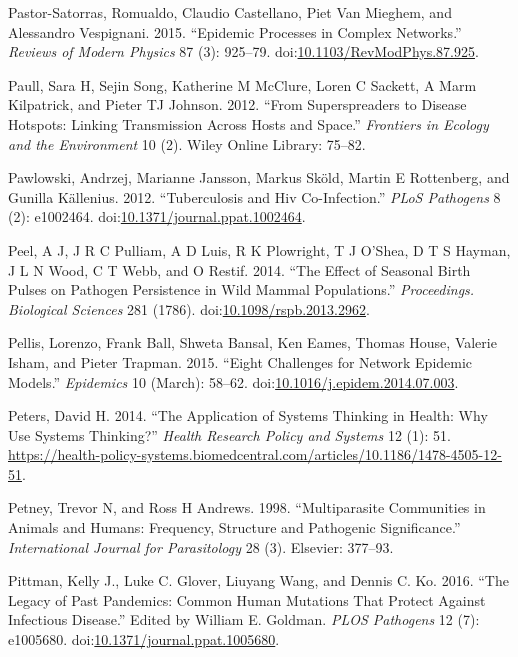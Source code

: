 \documentclass[]{article}
\theoremstyle{definition}
\theoremstyle{definition}
\theoremstyle{definition}
\theoremstyle{remark}
\begin{document}
\hypertarget{ref-pastor-satorras15}{}
Pastor-Satorras, Romualdo, Claudio Castellano, Piet Van Mieghem, and
Alessandro Vespignani. 2015. ``Epidemic Processes in Complex Networks.''
\emph{Reviews of Modern Physics} 87 (3): 925--79.
doi:\href{https://doi.org/10.1103/RevModPhys.87.925}{10.1103/RevModPhys.87.925}.

\hypertarget{ref-paull12}{}
Paull, Sara H, Sejin Song, Katherine M McClure, Loren C Sackett, A Marm
Kilpatrick, and Pieter TJ Johnson. 2012. ``From Superspreaders to
Disease Hotspots: Linking Transmission Across Hosts and Space.''
\emph{Frontiers in Ecology and the Environment} 10 (2). Wiley Online
Library: 75--82.

\hypertarget{ref-pawlowski12}{}
Pawlowski, Andrzej, Marianne Jansson, Markus Sköld, Martin E Rottenberg,
and Gunilla Källenius. 2012. ``Tuberculosis and Hiv Co-Infection.''
\emph{PLoS Pathogens} 8 (2): e1002464.
doi:\href{https://doi.org/10.1371/journal.ppat.1002464}{10.1371/journal.ppat.1002464}.

\hypertarget{ref-peel14}{}
Peel, A J, J R C Pulliam, A D Luis, R K Plowright, T J O'Shea, D T S
Hayman, J L N Wood, C T Webb, and O Restif. 2014. ``The Effect of
Seasonal Birth Pulses on Pathogen Persistence in Wild Mammal
Populations.'' \emph{Proceedings. Biological Sciences} 281 (1786).
doi:\href{https://doi.org/10.1098/rspb.2013.2962}{10.1098/rspb.2013.2962}.

\hypertarget{ref-pellis15}{}
Pellis, Lorenzo, Frank Ball, Shweta Bansal, Ken Eames, Thomas House,
Valerie Isham, and Pieter Trapman. 2015. ``Eight Challenges for Network
Epidemic Models.'' \emph{Epidemics} 10 (March): 58--62.
doi:\href{https://doi.org/10.1016/j.epidem.2014.07.003}{10.1016/j.epidem.2014.07.003}.

\hypertarget{ref-peters14}{}
Peters, David H. 2014. ``The Application of Systems Thinking in Health:
Why Use Systems Thinking?'' \emph{Health Research Policy and Systems} 12
(1): 51.
\url{https://health-policy-systems.biomedcentral.com/articles/10.1186/1478-4505-12-51}.

\hypertarget{ref-petney98}{}
Petney, Trevor N, and Ross H Andrews. 1998. ``Multiparasite Communities
in Animals and Humans: Frequency, Structure and Pathogenic
Significance.'' \emph{International Journal for Parasitology} 28 (3).
Elsevier: 377--93.

\hypertarget{ref-pittman16}{}
Pittman, Kelly J., Luke C. Glover, Liuyang Wang, and Dennis C. Ko. 2016.
``The Legacy of Past Pandemics: Common Human Mutations That Protect
Against Infectious Disease.'' Edited by William E. Goldman. \emph{PLOS
Pathogens} 12 (7): e1005680.
doi:\href{https://doi.org/10.1371/journal.ppat.1005680}{10.1371/journal.ppat.1005680}.
\end{document}
